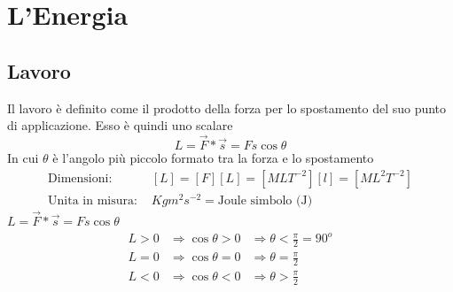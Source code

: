 \chapter{L'Energia}
\section{Lavoro}
\begin{defi}
	Il lavoro è definito come il prodotto della forza per lo spostamento del
	suo punto di applicazione. Esso è quindi uno scalare
	\begin{equation}
		L=\vec{F}*\vec{s}=Fs\cos \theta
	\end{equation}
	In cui $\theta$ è l'angolo più piccolo formato tra la forza e lo
	spostamento
	\begin{equation*}
		\begin{matrix}
			\text{Dimensioni: } & [L]=[F][L]=[MLT^{-2}][l]=[ML^2T^{-2}]\\
			\text{Unita in misura: } & Kg m^2 s^{-2} = \text{Joule simbolo (J)}
		\end{matrix}
	\end{equation*}
	$L=\vec{F}*\vec{s}=Fs\cos\theta$
	\begin{equation*}
		\begin{matrix}
			L>0 &\Rightarrow \cos \theta>0 &\Rightarrow \theta < \frac{\pi}{2}=90^o\\
			L=0 &\Rightarrow \cos \theta=0 &\Rightarrow \theta =
			\frac{\pi}{2}\\
			L<0& \Rightarrow \cos \theta <0 & \Rightarrow \theta > \frac{\pi}{2}
		\end{matrix}
	\end{equation*}
\end{defi}
